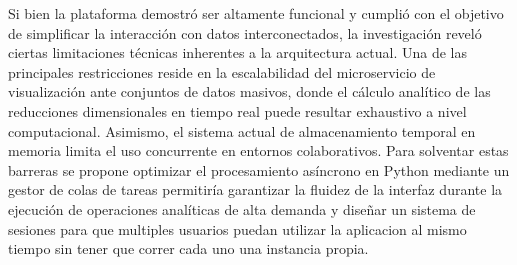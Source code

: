 \documentclass{article}
\begin{document}
Si bien la plataforma demostró ser altamente funcional y cumplió con el objetivo de simplificar la interacción con datos interconectados, la investigación reveló ciertas limitaciones técnicas inherentes a la arquitectura actual. Una de las principales restricciones reside en la escalabilidad del microservicio de visualización ante conjuntos de datos masivos, donde el cálculo analítico de las reducciones dimensionales en tiempo real puede resultar exhaustivo a nivel computacional. Asimismo, el sistema actual de almacenamiento temporal en memoria limita el uso concurrente en entornos colaborativos. Para solventar estas barreras se propone optimizar el procesamiento asíncrono en Python mediante un gestor de colas de tareas permitiría garantizar la fluidez de la interfaz durante la ejecución de operaciones analíticas de alta demanda y diseñar un sistema de sesiones para que multiples usuarios puedan utilizar la aplicacion al mismo tiempo sin tener que correr cada uno una instancia propia.

\nocite{*}  
 
\renewcommand{\refname}{Bibliografía}     
     
\end{document}
